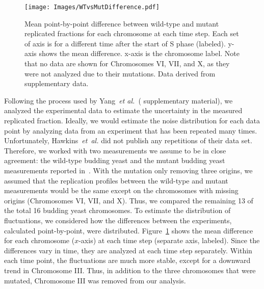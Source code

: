 		\begin{figure}[tbh]
			\begin{center}
				\texttt{[image: Images/WTvsMutDifference.pdf]}
			\end{center}
				\caption[Estimating Experimental Noise: Mean Point-By-Point Difference]{\label{fig:MeanDifference} Mean point-by-point difference between wild-type and mutant replicated fractions for each chromosome at each time step.
					Each set of axis is for a different time after the start of S phase (labeled).
					y-axis shows the mean difference.
					x-axis is the chromosome label.
					Note that no data are shown for Chromosomes VI, VII, and X, as they were not analyzed due to their mutations.
					Data derived from~\cite{StochasticTermination} supplementary data.
				}
		\end{figure}
		
		Following the process used by Yang~\emph{et al.}~(\cite{ScottsPaper} supplementary material), we analyzed the experimental data to estimate the uncertainty in the measured replicated fraction.
		Ideally, we would estimate the noise distribution for each data point by analyzing data from an experiment that has been repeated many times.
		Unfortunately, Hawkins~\emph{et~al.} did not publish any repetitions of their data set.
		Therefore, we worked with two measurements we assume to be in close agreement: the wild-type budding yeast and the mutant budding yeast measurements reported in~\cite{StochasticTemination}.
		With the mutation only removing three origins, we assumed that the replication profiles between the wild-type and mutant measurements would be the same except on the chromosomes with missing origins (Chromosomes VI, VII, and X).
		Thus, we compared the remaining 13 of the total 16 budding yeast chromosomes.
		To estimate the distribution of fluctuations, we considered how the differences between the experiments, calculated point-by-point, were distributed.
		Figure~\ref{fig:MeanDifference} shows the mean difference for each chromosome ($x$-axis) at each time step (separate axis, labeled).
		Since the differences vary in time, they are analyzed at each time step separately.
		Within each time point, the fluctuations are much more stable, except for a downward trend in Chromosome III.
		Thus, in addition to the three chromosomes that were mutated, Chromosome III was removed from our analysis.
		
